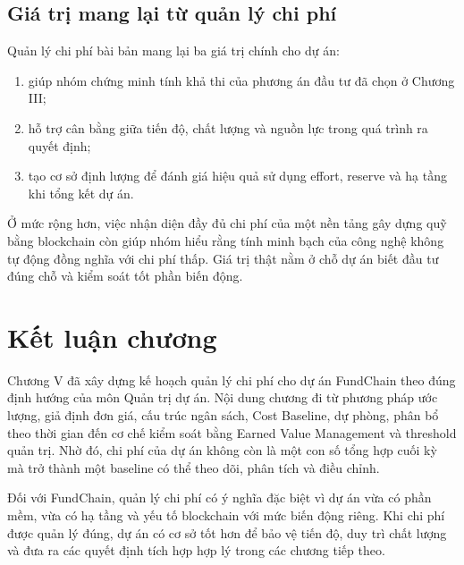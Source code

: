 \subsection{Giá trị mang lại từ quản lý chi phí}

Quản lý chi phí bài bản mang lại ba giá trị chính cho dự án:

\begin{enumerate}
  \item giúp nhóm chứng minh tính khả thi của phương án đầu tư đã chọn ở Chương III;
  \item hỗ trợ cân bằng giữa tiến độ, chất lượng và nguồn lực trong quá trình ra quyết định;
  \item tạo cơ sở định lượng để đánh giá hiệu quả sử dụng effort, reserve và hạ tầng khi tổng kết dự án.
\end{enumerate}

Ở mức rộng hơn, việc nhận diện đầy đủ chi phí của một nền tảng gây dựng quỹ bằng blockchain còn giúp nhóm hiểu rằng tính minh bạch của công nghệ không tự động đồng nghĩa với chi phí thấp. Giá trị thật nằm ở chỗ dự án biết đầu tư đúng chỗ và kiểm soát tốt phần biến động.

\fi
\section{Kết luận chương}

Chương V đã xây dựng kế hoạch quản lý chi phí cho dự án FundChain theo đúng định hướng của môn Quản trị dự án. Nội dung chương đi từ phương pháp ước lượng, giả định đơn giá, cấu trúc ngân sách, Cost Baseline, dự phòng, phân bổ theo thời gian đến cơ chế kiểm soát bằng Earned Value Management và threshold quản trị. Nhờ đó, chi phí của dự án không còn là một con số tổng hợp cuối kỳ mà trở thành một baseline có thể theo dõi, phân tích và điều chỉnh.

Đối với FundChain, quản lý chi phí có ý nghĩa đặc biệt vì dự án vừa có phần mềm, vừa có hạ tầng và yếu tố blockchain với mức biến động riêng. Khi chi phí được quản lý đúng, dự án có cơ sở tốt hơn để bảo vệ tiến độ, duy trì chất lượng và đưa ra các quyết định tích hợp hợp lý trong các chương tiếp theo.
